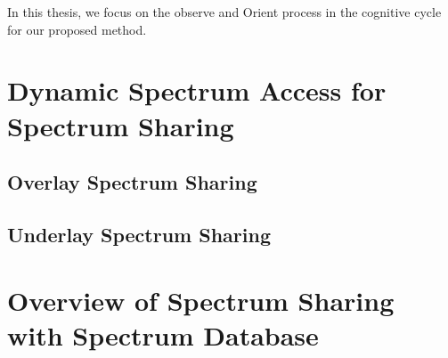 In this thesis, we focus on the observe and Orient process in the cognitive cycle for our proposed method.


\section{Dynamic Spectrum Access for Spectrum Sharing}
    \subsection{Overlay Spectrum Sharing}
    \subsection{Underlay Spectrum Sharing}

\section{Overview of Spectrum Sharing with Spectrum Database}
